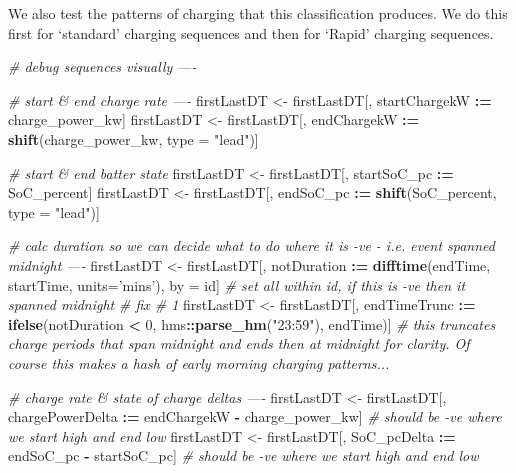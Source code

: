 \documentclass[]{article}
\newenvironment{Shaded}{\begin{snugshade}}{\end{snugshade}}
\newcommand{\CommentTok}[1]{\textcolor[rgb]{0.56,0.35,0.01}{\textit{#1}}}
\newcommand{\DataTypeTok}[1]{\textcolor[rgb]{0.13,0.29,0.53}{#1}}
\newcommand{\DecValTok}[1]{\textcolor[rgb]{0.00,0.00,0.81}{#1}}
\newcommand{\ErrorTok}[1]{\textcolor[rgb]{0.64,0.00,0.00}{\textbf{#1}}}
\newcommand{\KeywordTok}[1]{\textcolor[rgb]{0.13,0.29,0.53}{\textbf{#1}}}
\newcommand{\NormalTok}[1]{#1}
\newcommand{\OperatorTok}[1]{\textcolor[rgb]{0.81,0.36,0.00}{\textbf{#1}}}
\newcommand{\StringTok}[1]{\textcolor[rgb]{0.31,0.60,0.02}{#1}}
\begin{document}
We also test the patterns of charging that this classification produces. We do this first for `standard' charging sequences and then for `Rapid' charging sequences.

\begin{Shaded}
\begin{Highlighting}[]
\CommentTok{# debug sequences visually ----}

\CommentTok{# start & end charge rate ----}
\NormalTok{firstLastDT <-}\StringTok{ }\NormalTok{firstLastDT[, startChargekW }\OperatorTok{:}\ErrorTok{=}\StringTok{ }\NormalTok{charge_power_kw]}
\NormalTok{firstLastDT <-}\StringTok{ }\NormalTok{firstLastDT[, endChargekW }\OperatorTok{:}\ErrorTok{=}\StringTok{ }\KeywordTok{shift}\NormalTok{(charge_power_kw, }\DataTypeTok{type =} \StringTok{"lead"}\NormalTok{)]}

\CommentTok{# start & end batter state}
\NormalTok{firstLastDT <-}\StringTok{ }\NormalTok{firstLastDT[, startSoC_pc }\OperatorTok{:}\ErrorTok{=}\StringTok{ }\NormalTok{SoC_percent]}
\NormalTok{firstLastDT <-}\StringTok{ }\NormalTok{firstLastDT[, endSoC_pc }\OperatorTok{:}\ErrorTok{=}\StringTok{ }\KeywordTok{shift}\NormalTok{(SoC_percent, }\DataTypeTok{type =} \StringTok{"lead"}\NormalTok{)]}

\CommentTok{# calc duration so we can decide what to do where it is -ve - i.e. event spanned midnight ----}
\NormalTok{firstLastDT <-}\StringTok{ }\NormalTok{firstLastDT[, notDuration }\OperatorTok{:}\ErrorTok{=}\StringTok{ }\KeywordTok{difftime}\NormalTok{(endTime, startTime, }\DataTypeTok{units=}\StringTok{'mins'}\NormalTok{), by =}\StringTok{ }\NormalTok{id] }\CommentTok{# set all within id, if this is -ve then it spanned midnight}
\CommentTok{# fix # 1}
\NormalTok{firstLastDT <-}\StringTok{ }\NormalTok{firstLastDT[, endTimeTrunc }\OperatorTok{:}\ErrorTok{=}\StringTok{ }\KeywordTok{ifelse}\NormalTok{(notDuration }\OperatorTok{<}\StringTok{ }\DecValTok{0}\NormalTok{, }
\NormalTok{                                                   hms}\OperatorTok{::}\KeywordTok{parse_hm}\NormalTok{(}\StringTok{"23:59"}\NormalTok{),}
\NormalTok{                                                   endTime)] }\CommentTok{# this truncates charge periods that span midnight and ends then at midnight for clarity. Of course this makes a hash of early morning charging patterns... }

\CommentTok{# charge rate & state of charge deltas ----}
\NormalTok{firstLastDT <-}\StringTok{ }\NormalTok{firstLastDT[, chargePowerDelta }\OperatorTok{:}\ErrorTok{=}\StringTok{ }\NormalTok{endChargekW }\OperatorTok{-}\StringTok{ }\NormalTok{charge_power_kw] }\CommentTok{# should be -ve where we start high and end low}
\NormalTok{firstLastDT <-}\StringTok{ }\NormalTok{firstLastDT[, SoC_pcDelta }\OperatorTok{:}\ErrorTok{=}\StringTok{ }\NormalTok{endSoC_pc }\OperatorTok{-}\StringTok{ }\NormalTok{startSoC_pc] }\CommentTok{# should be -ve where we start high and end low}
\end{Highlighting}
\end{Shaded}
\end{document}
